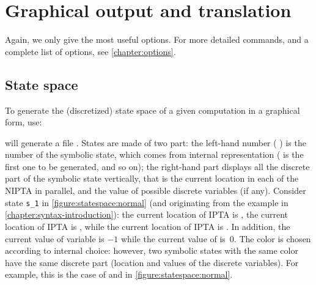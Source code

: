 \chapter{Graphical output and translation}


Again, we only give the most useful options.
For more detailed commands, and a complete list of options, see \cref{chapter:options}.

\section{State space}

To generate the (discretized) state space of a given computation in a graphical form, use:


\imitator{} will generate a file .
States are made of two part: the left-hand number (\eg{} ) is the number of the symbolic state, which comes from \imitator{} internal representation ( is the first one to be generated, and so on); the right-hand part displays all the discrete part of the symbolic state vertically, that is the current location in each of the NIPTA in parallel, and the value of possible discrete variables (if any).
Consider state \texttt{s\_1} in \cref{figure:statespace:normal} (and originating from the example in \cref{chapter:syntax-introduction}):
the current location of IPTA  is ,
the current location of IPTA  is ,
while
the current location of IPTA  is .
In addition, the current value of variable  is $-1$ while the current value of  is~0.
The color is chosen according to \imitator{} internal choice: however, two symbolic states with the same color have the same discrete part (location and values of the discrete variables).
For example, this is the case of  and  in \cref{figure:statespace:normal}.


